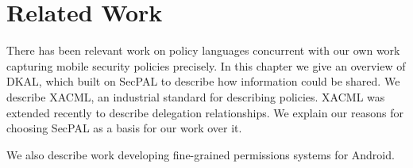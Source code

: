 \documentclass[thesis.tex]{subfiles}
\begin{document}
\chapter{Related Work}
\label{chap:related-work}
   
There has been relevant work on policy languages concurrent with our
own work capturing mobile security policies precisely. In this chapter
we give an overview of DKAL, which built on SecPAL to describe how
information could be shared. We describe XACML, an industrial standard
for describing policies.  XACML was extended recently to describe
delegation relationships. We explain our reasons for choosing SecPAL
as a basis for our work over it.

We also describe work developing fine-grained permissions systems for
Android.  
\end{document}
